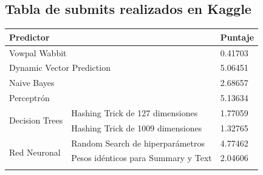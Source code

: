 \documentclass[10pt,a4paper]{article}
\begin{document}
\subsection{Tabla de submits realizados en Kaggle}
\begin{table}[H]
\centering
\label{tabla}
\begin{tabular}{|l|l|ll|}
\hline
\multicolumn{3}{|l}{\textbf{Predictor}}                                                                                            & \multicolumn{1}{l|}{\textbf{Puntaje}} \\ \hline
\multicolumn{3}{|l}{Vowpal Wabbit}                                                                                                 & 0.41703                               \\ \hline
\multicolumn{3}{|l}{Dynamic Vector Prediction}                                                                                     & 5.06451                               \\ \hline
\multicolumn{3}{|l}{Naive Bayes}                                                                                                   & 	2.68657                              \\ \hline
\multicolumn{3}{|l}{Perceptrón}                                                                                                    & 5.13634                               \\ \hline
\multirow{2}{*}{Decision Trees}                                                                                                & \multicolumn{2}{l}{Hashing Trick de 127 dimensiones} 
                                                                        & 1.77059                   \\ \cline{2-4}
                                        & \multicolumn{2}{l}{Hashing Trick de 1009 dimensiones} 
                                                                        & 1.32765 
                                                        \\ \hline
\multirow{9}{*}{Red Neuronal} & \multicolumn{2}{l}{Random Search de hiperparámetros}                                                                            & 4.77462                                                          \\ \cline{2-4} 
                              & \multicolumn{2}{l}{Pesos idénticos para Summary y Text}                                            & 2.04606                               \\ \cline{2-4} 

\end{tabular}
\end{table}
\end{document}
